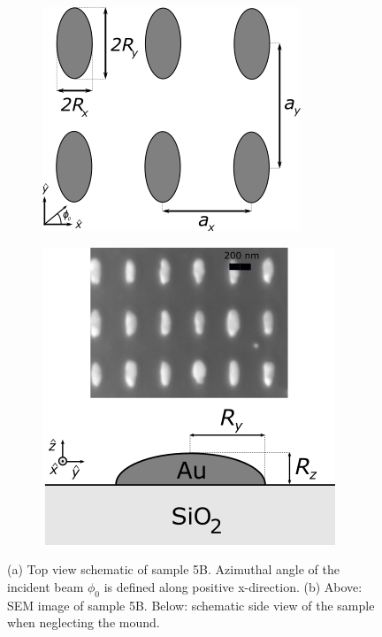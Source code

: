 \begin{figure}
    \begin{subfigure}{0.5\textwidth}
        \centering
        \includegraphics[width=0.8\linewidth]{figures/Ch3/s5b/S5B_topview_phi.png}
        \caption{}
        \label{fig:S5B_schematic_overview_topview}
    \end{subfigure}
    \begin{subfigure}{0.5\textwidth}
        \centering
        \includegraphics[width=0.66\linewidth]{figures/Ch3/s5b/S5B_sideview+SEM.png}
        \caption{}
        \label{fig:S5B_schematic_overview_SEM_sideview}
    \end{subfigure}
    \caption{(a) Top view schematic of sample 5B. Azimuthal angle of the incident beam $\phi_0$ is defined along positive x-direction. (b) Above: SEM image of sample 5B. Below: schematic side view of the sample when neglecting the mound.}
    \label{fig:S5B_schematic_overview}
\end{figure}

